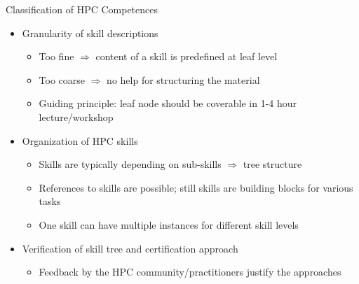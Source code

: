 \documentclass[compress,aspectratio=169]{beamer}
\begin{document}
\begin{frame}{Classification of HPC Competences}
	\begin{itemize}
		\item Granularity of skill descriptions
		\begin{itemize}
			\item Too fine $\Rightarrow$ content of a skill is predefined at leaf level
			\item Too coarse $\Rightarrow$ no help for structuring the material
			\item Guiding principle: leaf node should be coverable in 1-4 hour lecture/workshop
		\end{itemize}


    \item Organization of HPC skills
    \begin{itemize}
      \item Skills are typically depending on sub-skills $\Rightarrow$ tree structure
      \item References to skills are possible; still skills are building blocks for various tasks
      \item One skill can have multiple instances for different skill levels
    \end{itemize}


    \item Verification of skill tree and certification approach
      \begin{itemize}
        \item Feedback by the HPC community/practitioners justify the approaches
      \end{itemize}
	\end{itemize}
\end{frame}
\end{document}
